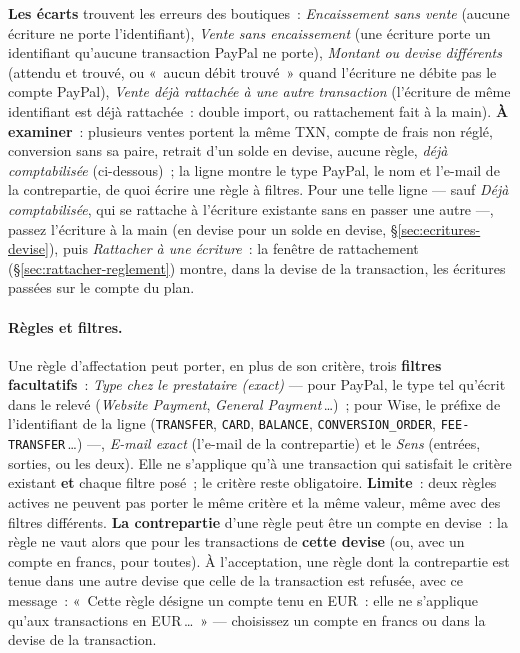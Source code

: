 \documentclass[a4paper,11pt,oneside]{article}
\begin{document}
\textbf{Les écarts} trouvent les erreurs des boutiques~: \emph{Encaissement sans vente} (aucune écriture ne porte l'identifiant), \emph{Vente sans encaissement} (une écriture porte un identifiant qu'aucune transaction PayPal ne porte), \emph{Montant ou devise différents} (attendu et trouvé, ou «~aucun débit trouvé~» quand l'écriture ne débite pas le compte PayPal), \emph{Vente déjà rattachée à une autre transaction} (l'écriture de même identifiant est déjà rattachée~: double import, ou rattachement fait à la main). \textbf{À examiner}~: plusieurs ventes portent la même TXN, compte de frais non réglé, conversion sans sa paire, retrait d'un solde en devise, aucune règle, \emph{déjà comptabilisée} (ci-dessous)~; la ligne montre le type PayPal, le nom et l'e-mail de la contrepartie, de quoi écrire une règle à filtres. Pour une telle ligne --- sauf \emph{Déjà comptabilisée}, qui se rattache à l'écriture existante sans en passer une autre ---, passez l'écriture à la main (en devise pour un solde en devise, \S\ref{sec:ecritures-devise}), puis \emph{Rattacher à une écriture}~: la fenêtre de rattachement (\S\ref{sec:rattacher-reglement}) montre, dans la devise de la transaction, les écritures passées sur le compte du plan.

\paragraph{Règles et filtres.} Une règle d'affectation peut porter, en plus de son critère, trois \textbf{filtres facultatifs}~: \emph{Type chez le prestataire (exact)} --- pour PayPal, le type tel qu'écrit dans le relevé (\emph{Website Payment}, \emph{General Payment}\,\dots)~; pour Wise, le préfixe de l'identifiant de la ligne (\texttt{TRANSFER}, \texttt{CARD}, \texttt{BALANCE}, \texttt{CONVERSION\_ORDER}, \texttt{FEE-TRANSFER}\,\dots) ---, \emph{E-mail exact} (l'e-mail de la contrepartie) et le \emph{Sens} (entrées, sorties, ou les deux). Elle ne s'applique qu'à une transaction qui satisfait le critère existant \textbf{et} chaque filtre posé~; le critère reste obligatoire. \textbf{Limite}~: deux règles actives ne peuvent pas porter le même critère et la même valeur, même avec des filtres différents. \textbf{La contrepartie} d'une règle peut être un compte en devise~: la règle ne vaut alors que pour les transactions de \textbf{cette devise} (ou, avec un compte en francs, pour toutes). À l'acceptation, une règle dont la contrepartie est tenue dans une autre devise que celle de la transaction est refusée, avec ce message~: «~Cette règle désigne un compte tenu en EUR~: elle ne s'applique qu'aux transactions en EUR\,\dots~» --- choisissez un compte en francs ou dans la devise de la transaction.
\end{document}

